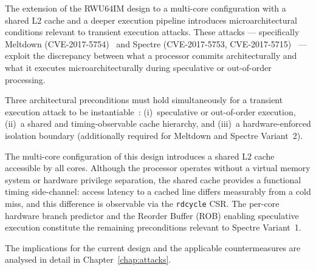 The extension of the RWU64IM design to a multi-core configuration with a shared
\mbox{L2} cache and a deeper execution pipeline introduces microarchitectural
conditions relevant to transient execution attacks.  These attacks — specifically
Meltdown (CVE-2017-5754)~\cite{lipp2018meltdown} and Spectre
(CVE-2017-5753, CVE-2017-5715)~\cite{kocher2019spectre} — exploit the
discrepancy between what a processor commits architecturally and what it executes
microarchitecturally during speculative or out-of-order processing.

Three architectural preconditions must hold simultaneously for a transient execution
attack to be instantiable~\cite{kocher2019spectre,intel2018analysis}:
(i)~speculative or out-of-order execution,
(ii)~a shared and timing-observable cache hierarchy, and
(iii)~a hardware-enforced isolation boundary (additionally required for Meltdown and
Spectre Variant~2).

The multi-core configuration of this design introduces a shared \mbox{L2} cache
accessible by all cores.  Although the processor operates without a virtual memory
system or hardware privilege separation, the shared cache provides a functional
timing side-channel: access latency to a cached line differs measurably from a cold
miss, and this difference is observable via the \texttt{rdcycle} CSR.  The per-core
hardware branch predictor and the Reorder Buffer (ROB) enabling speculative execution
constitute the remaining preconditions relevant to Spectre Variant~1.

The implications for the current design and the applicable countermeasures are
analysed in detail in Chapter~\ref{chap:attacks}.


%
%
%
%


